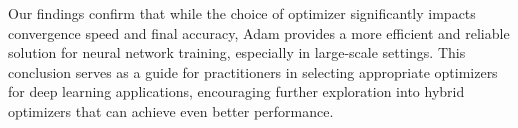 \documentclass{article}
\begin{document}
Our findings confirm that while the choice of optimizer significantly impacts convergence speed and final accuracy, Adam \citep{ho2019flow} provides a more efficient and reliable solution for neural network training, especially in large-scale settings. This conclusion serves as a guide for practitioners in selecting appropriate optimizers for deep learning applications, encouraging further exploration into hybrid optimizers that can achieve even better performance.



\end{document}
